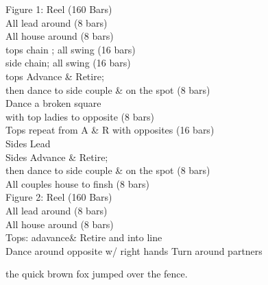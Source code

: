 \documentclass[10pt]{article}
\begin{document}



\begin{minipage}[t]{0.45\textwidth}
\vspace{0pt}
Figure 1: Reel (160 Bars)\\


All lead around (8 bars)\\
All house around (8 bars)\\
tops chain ; all swing (16 bars)\\
side chain; all swing (16 bars)\\
tops Advance \& Retire; \\
then dance to side couple \& on the spot (8 bars)\\
Dance a broken square\\
with top ladies to opposite  (8 bars)\\
Tops repeat from A \& R with opposites (16 bars)\\
Sides Lead \\
Sides Advance \& Retire; \\
then dance to side couple \& on the spot (8 bars)\\
All couples house to finsh (8 bars)\\


Figure 2: Reel (160 Bars)\\

All lead around (8 bars)\\
All house around (8 bars)\\
Tops: adavance\& Retire and into line\\
Dance around opposite w/ right hands
Turn around partners\\
\end{minipage}
\hfill
\begin{minipage}[t]{0.45\textwidth}
\vspace{0pt}


the quick brown fox jumped over the fence.
\end{minipage}
\end{document}

